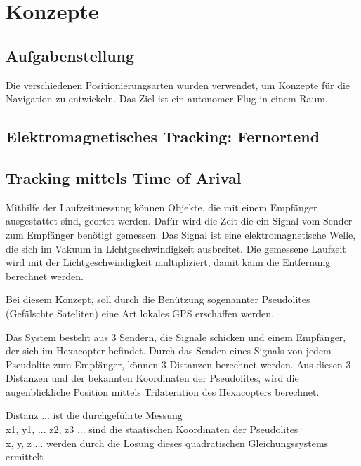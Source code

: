   \section{Konzepte}

    \subsection{Aufgabenstellung}
    Die verschiedenen Positionierungsarten wurden verwendet, um Konzepte für die Navigation zu entwickeln. Das Ziel ist ein autonomer Flug in einem Raum.

    \subsection{Elektromagnetisches Tracking: Fernortend}

      \subsection*{Tracking mittels Time of Arival}
      Mithilfe der Laufzeitmessung können Objekte, die mit einem Empfänger ausgestattet sind, geortet werden. Dafür wird die Zeit die ein Signal vom Sender zum Empfänger benötigt gemessen. Das Signal ist eine elektromagnetische Welle, die sich im Vakuum in Lichtgeschwindigkeit ausbreitet. Die gemessene Laufzeit wird mit der Lichtgeschwindigkeit multipliziert, damit kann die Entfernung berechnet werden.

      Bei diesem Konzept, soll durch die Benützung sogenannter Pseudolites (Gefälschte Sateliten) eine Art lokales GPS erschaffen werden.

      Das System besteht aus 3 Sendern, die Signale schicken und einem Empfänger, der sich im Hexacopter befindet.
      Durch das Senden eines Signals von jedem Pseudolite zum Empfänger, können 3 Distanzen berechnet werden.
      Aus diesen 3 Distanzen und der bekannten Koordinaten der Pseudolites, wird die augenblickliche Position mittels Trilateration des Hexacopters berechnet.


      Distanz ... ist die durchgeführte Messung\\
      x1, y1, ... z2, z3 ... sind die staatischen Koordinaten der Pseudolites \\
      x, y, z ... werden durch die Lösung dieses quadratischen Gleichungssystems ermittelt \\

